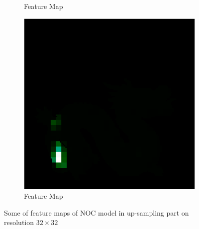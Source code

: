\begin{figure}[H]
\begin{subfigure}[b]{0.19\linewidth}
		\caption{Feature Map}
	\end{subfigure}
	\begin{subfigure}[b]{0.19\linewidth}
		\includegraphics[width=\linewidth]{./Figures/feature_map_gcnn/feature_map_gcnn-noc_104.png}
		\caption{Feature Map}
	\end{subfigure}
	
	\decoRule
	\caption{Some of feature maps of NOC model in up-sampling part on resolution $ 32\times32 $}
	\label{fig:detail-feature-maps}
\end{figure}




